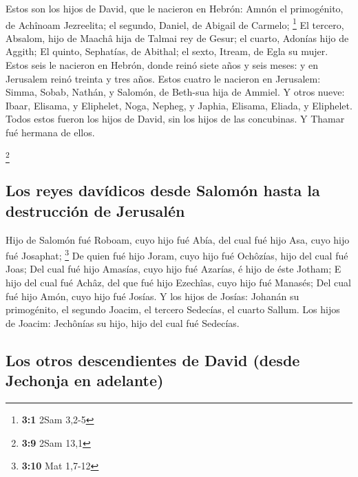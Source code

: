  Estos son los hijos de David, que le nacieron en Hebrón:
Amnón el primogénito, de Achînoam Jezreelita; el segundo, Daniel, de
Abigail de Carmelo; \footnote{\textbf{3:1} 2Sam 3,2-5}  El
tercero, Absalom, hijo de Maachâ hija de Talmai rey de Gesur; el cuarto,
Adonías hijo de Aggith;  El quinto, Sephatías, de Abithal;
el sexto, Itream, de Egla su mujer.  Estos seis le nacieron
en Hebrón, donde reinó siete años y seis meses: y en Jerusalem reinó
treinta y tres años.  Estos cuatro le nacieron en Jerusalem:
Simma, Sobab, Nathán, y Salomón, de Beth-sua hija de Ammiel.
 Y otros nueve: Ibaar, Elisama, y Eliphelet, 
Noga, Nepheg, y Japhia,  Elisama, Eliada, y Eliphelet.
 Todos estos fueron los hijos de David, sin los hijos de las
concubinas. Y Thamar fué hermana de ellos.

\footnote{\textbf{3:9} 2Sam 13,1}

\hypertarget{los-reyes-davuxeddicos-desde-salomuxf3n-hasta-la-destrucciuxf3n-de-jerusaluxe9n}{%
\subsection{Los reyes davídicos desde Salomón hasta la destrucción de
Jerusalén}\label{los-reyes-davuxeddicos-desde-salomuxf3n-hasta-la-destrucciuxf3n-de-jerusaluxe9n}}

 Hijo de Salomón fué Roboam, cuyo hijo fué Abía, del cual
fué hijo Asa, cuyo hijo fué Josaphat; \footnote{\textbf{3:10} Mat 1,7-12}
 De quien fué hijo Joram, cuyo hijo fué Ochôzías, hijo del
cual fué Joas;  Del cual fué hijo Amasías, cuyo hijo fué
Azarías, é hijo de éste Jotham;  E hijo del cual fué Achâz,
del que fué hijo Ezechîas, cuyo hijo fué Manasés;  Del cual
fué hijo Amón, cuyo hijo fué Josías.  Y los hijos de
Josías: Johanán su primogénito, el segundo Joacim, el tercero Sedecías,
el cuarto Sallum.  Los hijos de Joacim: Jechônías su hijo,
hijo del cual fué Sedecías.

\hypertarget{los-otros-descendientes-de-david-desde-jechonja-en-adelante}{%
\subsection{Los otros descendientes de David (desde Jechonja en
adelante)}\label{los-otros-descendientes-de-david-desde-jechonja-en-adelante}}

